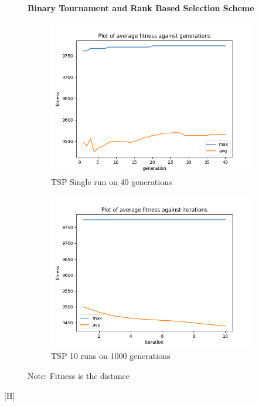 \documentclass[a4paper]{exam}
\begin{document}
\begin{questions}
  \begin{figure}[H]
    \centering
    \textbf{Binary Tournament and Rank Based Selection Scheme}
    \begin{subfigure}{.5\textwidth}
      \centering
      \includegraphics[width=1\linewidth]{images/ks_bt_rbs_gen.png}
      \caption{TSP Single run on 40 generations}
      \label{fig:ks_bt_rbs_sub1}
    \end{subfigure}%
    \begin{subfigure}{.5\textwidth}
      \centering
      \includegraphics[width=1\linewidth]{images/ks_bt_rbs_itr.png}
      \caption{TSP 10 runs on 1000 generations}
      \label{fig:ks_bt_rbs_sub2}
    \end{subfigure}
    \caption{Note: Fitness is the distance}
    \label{fig:ks_bt_rbs}
  \end{figure}

  [H]
\end{questions}
\end{document}
